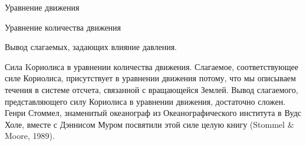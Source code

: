 \begin{chapter}{Уравнение движения}
\begin{section}{Уравнение количества движения}
\begin{paragraph}{Вывод слагаемых, задающих влияние давления.}
\end{paragraph}

\begin{paragraph}{Сила Kориолиса в уравнении количества движения.}
Слагаемое, соответствующее силе Кориолиса, присутствует в уравнении движения
потому, что мы описываем течения в системе отсчета, связанной с
вращающейся Землей. Вывод слагаемого, представляющего силу Кориолиса 
в уравнении движения, достаточно сложен. Генри Стоммел, знаменитый океанограф 
из Океанографического института в Вудс Холе, вместе с Дэннисом Муром 
посвятили этой силе целую книгу (Stommel \& Moore, 1989).
%


\end{paragraph}
\end{section}
\end{chapter}
